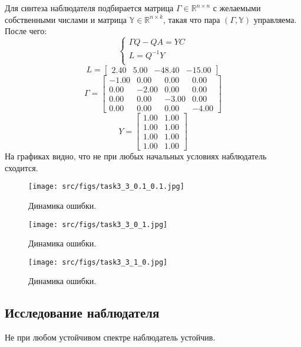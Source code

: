 Для синтеза наблюдателя подбирается матрица \(\Gamma \in \mathds{R}^{n \times n}\) с желаемыми собственными числами и матрица \(\mathds{Y} \in \mathds{R}^{n \times k}\), такая что пара \((\Gamma, \mathds{Y})\) управляема. После чего:
\[
    \begin{cases}
        \Gamma Q - QA = YC \\
        L = Q^{-1}Y \\
    \end{cases}
\]
\[L = \begin{bmatrix}
        2.40 &  5.00 & -48.40 & -15.00
      \end{bmatrix}\]
      \[\Gamma = \begin{bmatrix}
       -1.00 &  0.00 &  0.00 &  0.00\\
        0.00 & -2.00 &  0.00 &  0.00\\
        0.00 &  0.00 & -3.00 &  0.00\\
        0.00 &  0.00 &  0.00 & -4.00
      \end{bmatrix}\]
      \[Y = \begin{bmatrix}
        1.00 &  1.00\\
        1.00 &  1.00\\
        1.00 &  1.00\\
        1.00 &  1.00
      \end{bmatrix}\]
На графиках видно, что не при любых начальных условиях наблюдатель сходится.

\begin{figure}[ht!]
        \centering
        \texttt{[image: src/figs/task3\_3\_0.1\_0.1.jpg]}
        \caption{Динамика ошибки.}
        \label{fig:task3_3_0.1_0.1.jpg}
\end{figure}
\begin{figure}[ht!]
        \centering
        \texttt{[image: src/figs/task3\_3\_0\_1.jpg]}
        \caption{Динамика ошибки.}
        \label{fig:task3_3_0_1.jpg}
\end{figure}

\begin{figure}[ht!]
        \centering
        \texttt{[image: src/figs/task3\_3\_1\_0.jpg]}
        \caption{Динамика ошибки.}
        \label{fig:task3_3_1_0.jpg}
\end{figure}
\FloatBarrier

\subsection{Исследование наблюдателя}
Не при любом устойчивом спектре наблюдатель устойчив. 


